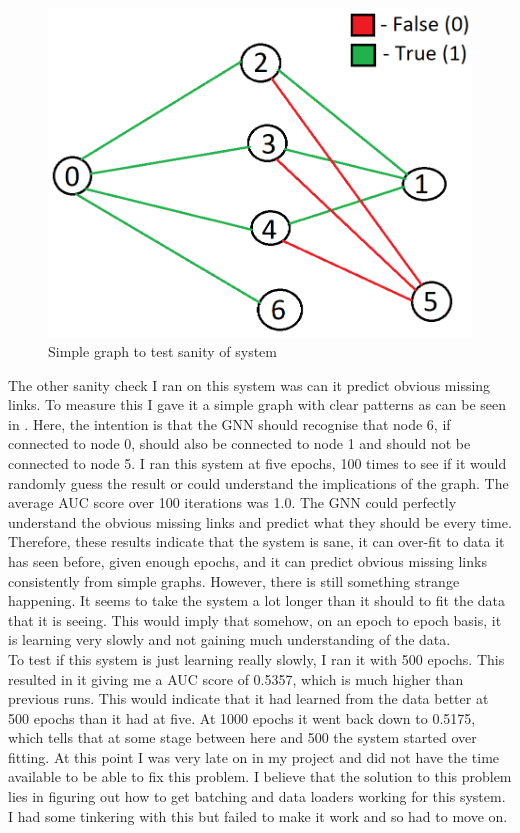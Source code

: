 \documentclass{l4proj}
\begin{document}
\begin{figure}[h]
    \centering
    \includegraphics[width=0.5\linewidth]{images/sanity_graph.png}
    \caption{Simple graph to test sanity of system}
    \label{fig:sanity_graph}
\end{figure}

The other sanity check I ran on this system was can it predict obvious missing links. To measure this I gave it a simple graph with clear patterns as can be seen in . Here, the intention is that the GNN should recognise that node 6, if connected to node 0, should also be connected to node 1 and should not be connected to node 5. I ran this system at five epochs, 100 times to see if it would randomly guess the result or could understand the implications of the graph. The average AUC score over 100 iterations was 1.0. The GNN could perfectly understand the obvious missing links and predict what they should be every time. \\

Therefore, these results indicate that the system is sane, it can over-fit to data it has seen before, given enough epochs, and it can predict obvious missing links consistently from simple graphs. However, there is still something strange happening. It seems to take the system a lot longer than it should to fit the data that it is seeing. This would imply that somehow, on an epoch to epoch basis, it is learning very slowly and not gaining much understanding of the data. \\

To test if this system is just learning really slowly, I ran it with 500 epochs. This resulted in it giving me a AUC score of 0.5357, which is much higher than previous runs. This would indicate that it had learned from the data better at 500 epochs than it had at five. At 1000 epochs it went back down to 0.5175, which tells that at some stage between here and 500 the system started over fitting. At this point I was very late on in my project and did not have the time available to be able to fix this problem. I believe that the solution to this problem lies in figuring out how to get batching and data loaders working for this system. I had some tinkering with this but failed to make it work and so had to move on. \\
\end{document}
